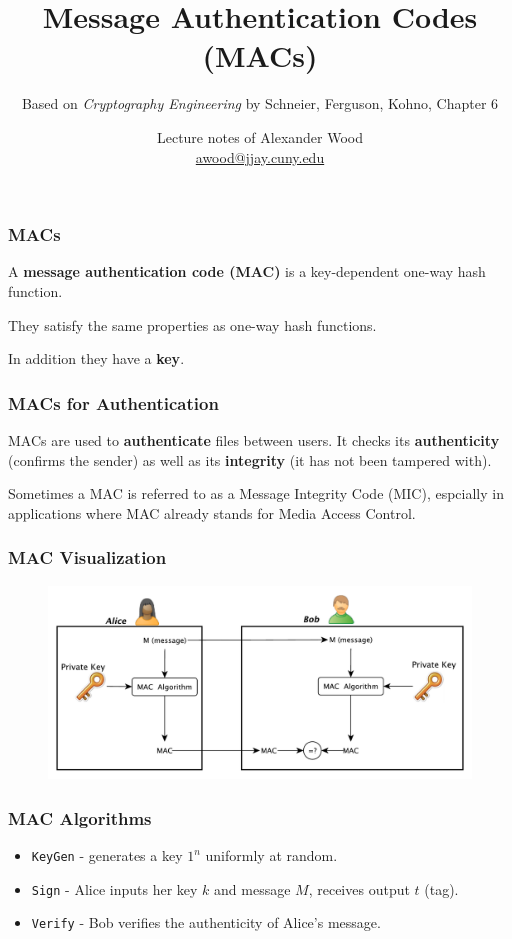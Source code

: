 \documentclass{beamer}
\title[HF]{Message Authentication Codes (MACs)}
\subtitle{Based on \emph{Cryptography Engineering} by Schneier, Ferguson, Kohno, Chapter 6}
\author
{Lecture notes of Alexander Wood \\ \scriptsize \href{mailto:awood@jjay.cuny.edu}{awood@jjay.cuny.edu}}
\institute[JJay]{John Jay College of Criminal Justice}
\date{}
\newcommand{\<}{\langle}
\renewcommand{\>}{\rangle}
\begin{document}

\begin{frame}
  \titlepage
\end{frame}


\begin{frame}
\frametitle{MACs}

A \textbf{message authentication code (MAC)} is a key-dependent one-way hash function.
\newline

They satisfy the same properties as one-way hash functions.\newline

In addition they have a \textbf{key}.
\end{frame}


\begin{frame}
\frametitle{MACs for Authentication}

MACs are used to \textbf{authenticate} files between users. It checks its \textbf{authenticity} (confirms the sender) as well as its \textbf{integrity} (it has not been tampered with). \newline

Sometimes a MAC is referred to as a Message Integrity Code (MIC), espcially in applications where MAC already stands for Media Access Control. 
\end{frame}


\begin{frame}
\frametitle{MAC Visualization}

\begin{figure}
\centering
\includegraphics[scale=.45]{IMG/MAC}
\end{figure}
\end{frame}

\begin{frame}[fragile]
\frametitle{MAC Algorithms}

\begin{itemize}
\item \verb|KeyGen| - generates a key $1^n$ uniformly at random.
\item \verb|Sign| - Alice inputs her key $k$ and message $M$, receives output $t$ (tag).
\item \verb|Verify| - Bob verifies the authenticity of Alice's message.
\end{itemize}
\end{frame}
\end{document}
